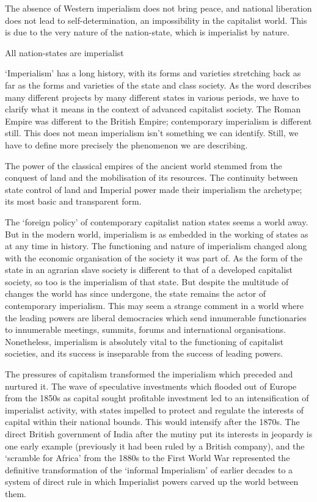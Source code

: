The absence of Western imperialism does not bring peace, and national liberation does not lead to self-determination, an impossibility in the capitalist world. This is due to the very nature of the nation-state, which is imperialist by nature.

All nation-states are imperialist

‘Imperialism’ has a long history, with its forms and varieties stretching back as far as the forms and varieties of the state and class society. As the word describes many different projects by many different states in various periods, we have to clarify what it means in the context of advanced capitalist society. The Roman Empire was different to the British Empire; contemporary imperialism is different still. This does not mean imperialism isn’t something we can identify. Still, we have to define more precisely the phenomenon we are describing.

The power of the classical empires of the ancient world stemmed from the conquest of land and the mobilisation of its resources. The continuity between state control of land and Imperial power made their imperialism the archetype; its most basic and transparent form.

The ‘foreign policy’ of contemporary capitalist nation states seems a world away. But in the modern world, imperialism is as embedded in the working of states as at any time in history. The functioning and nature of imperialism changed along with the economic organisation of the society it was part of. As the form of the state in an agrarian slave society is different to that of a developed capitalist society, so too is the imperialism of that state. But despite the multitude of changes the world has since undergone, the state remains the actor of contemporary imperialism. This may seem a strange comment in a world where the leading powers are liberal democracies which send innumerable functionaries to innumerable meetings, summits, forums and international organisations. Nonetheless, imperialism is absolutely vital to the functioning of capitalist societies, and its success is inseparable from the success of leading powers.

The pressures of capitalism transformed the imperialism which preceded and nurtured it. The wave of speculative investments which flooded out of Europe from the 1850s as capital sought profitable investment led to an intensification of imperialist activity, with states impelled to protect and regulate the interests of capital within their national bounds. This would intensify after the 1870s. The direct British government of India after the mutiny put its interests in jeopardy is one early example (previously it had been ruled by a British company), and the ‘scramble for Africa’ from the 1880s to the First World War represented the definitive transformation of the ‘informal Imperialism’ of earlier decades to a system of direct rule in which Imperialist powers carved up the world between them.

